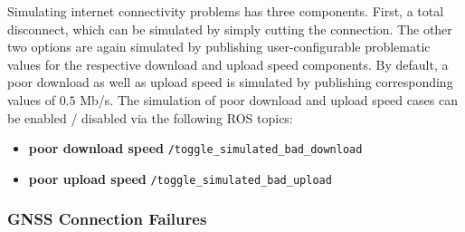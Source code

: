 \documentclass[english, master, utf8]{base/thesis_KBS}
\newcommand{\code}[1]{\colorbox{light-gray}{\texttt{#1}}}
\begin{document}
Simulating internet connectivity problems has three components. First, a total disconnect, which can be simulated by simply cutting the connection.
The other two options are again simulated by publishing user-configurable problematic values for the respective download and upload speed components.
By default, a poor download as well as upload speed is simulated by publishing corresponding values of $0.5$ Mb/s.
The simulation of poor download and upload speed cases can be enabled / disabled via the following ROS topics:
\begin{itemize}
    \item \textbf{poor download speed} \textrightarrow \code{/toggle\_simulated\_bad\_download}
    \item \textbf{poor upload speed} \textrightarrow \code{/toggle\_simulated\_bad\_upload}
\end{itemize}

\subsubsection{GNSS Connection Failures}
\label{sec:sim_and_mon_gnss_connection_problems}
\end{document}

